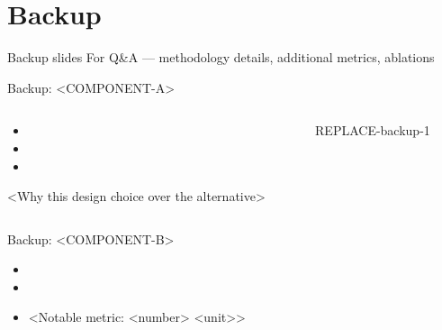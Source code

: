 \documentclass[aspectratio=169,12pt]{beamer}
\begin{document}
\appendix

\section*{Backup}

\begin{frame}[plain]{Backup slides}
  \vfill
  \centering
  \Large For Q\&A --- methodology details, additional metrics, ablations
  \vfill
\end{frame}

\begin{frame}{Backup: <COMPONENT-A>}
  \begin{columns}[T]
    \begin{column}{0.5\textwidth}
      \begin{itemize}
        \item <Pipeline step 1>
        \item <Pipeline step 2>
        \item <Pipeline step 3>
      \end{itemize}
      <Why this design choice over the alternative>
    \end{column}
    \begin{column}{0.45\textwidth}
      \fbox{\rule{0pt}{4.5cm}\rule{\textwidth}{0pt}}
      \begin{center}\footnotesize REPLACE-backup-1\end{center}
    \end{column}
  \end{columns}
\end{frame}

\begin{frame}{Backup: <COMPONENT-B>}
  \begin{itemize}
    \item <Key configuration detail 1>
    \item <Key configuration detail 2>
    \item <Notable metric: <number> <unit>>
  \end{itemize}
\end{frame}
\end{document}
